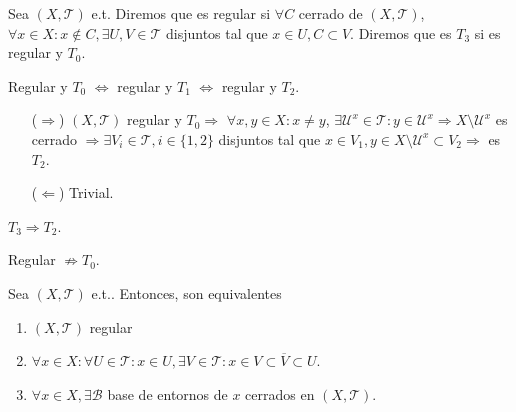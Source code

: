 \begin{defn}
  Sea $( X, \mathcal{T} )$ e.t. Diremos que es regular si $\forall C$ cerrado de $( X, \mathcal{T} )$, $\forall x \in X : x \not \in C, \exists U , V \in \mathcal{T}$ disjuntos tal que $x \in U, C \subset V$. Diremos que es $T_{3}$ si es regular y $T_{0}$.
\end{defn}

\begin{obs}
  Regular y $T_{0}$ $\Leftrightarrow $ regular y $ T_{1}$ $\Leftrightarrow$ regular y $T_{2}$.
\end{obs}

\begin{dem}
  \begin{enumerate}[label=(\roman*)]
    \item [($\Rightarrow$)] $( X, \mathcal{T} )$ regular y $T_{0} \Rightarrow$ $\forall x,y \in X : x \neq y$, $\exists \mathcal{U}^{x} \in \mathcal{T}: y \in \mathcal{U}^{x} \Rightarrow X \setminus \mathcal{U}^{x}$ es cerrado $\Rightarrow \exists V_{i} \in \mathcal{T}, i \in \{  1, 2 \}$ disjuntos tal que $x \in V_{1}, y \in X \setminus \mathcal{U}^{x} \subset V_{2} \Rightarrow$ es $T_{2}$.
    \item [($\Leftarrow$)] Trivial.
  \end{enumerate}
\end{dem}

\begin{obs}
  $T_{3} \Rightarrow T_{2}$.
\end{obs}

\begin{obs}
  Regular $\not \Rightarrow T_{0}$.
\end{obs}

\begin{prop}
  Sea $( X, \mathcal{T} )$ e.t.. Entonces, son equivalentes
  \begin{enumerate}[label=(\roman*)]
    \item $( X, \mathcal{T} )$ regular
    \item $\forall x \in X : \forall U \in \mathcal{T} : x \in U, \exists V \in \mathcal{T}: x \in V \subset \overline{V} \subset U$.
    \item $\forall x \in X, \exists \mathcal{B}$ base de entornos de $x$ cerrados en $( X, \mathcal{T} )$.
  \end{enumerate}
\end{prop}

